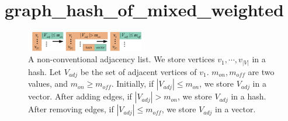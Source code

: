 \documentclass{vldb}
\begin{document}
	
	
	\sloppy

	
	\newpage
	\setcounter{page}{1}

	
	
	

	
	

	
	\section*{graph\_hash\_of\_mixed\_weighted} 
	


\begin{figure} [!t]
	\vspace{0.1cm}
	\centering
	\includegraphics[width=0.46\textwidth]{adj_list}
	\caption{A non-conventional adjacency list. We store vertices $v_1, \cdots, v_{|V|}$ in a hash. Let $V_{adj}$ be the set of adjacent vertices of $v_1$. $m_{on},m_{off}$ are two values, and $m_{on} \geq m_{off}$. Initially, if $|V_{adj}| \leq m_{on}$, we store $V_{adj}$ in a vector. After adding edges, if $|V_{adj}| > m_{on}$, we store $V_{adj}$ in a hash. After removing edges, if $|V_{adj}| \leq m_{off}$, we store $V_{adj}$ in a vector.}
	\label{Figure: adj_list}
\end{figure}
\end{document}
